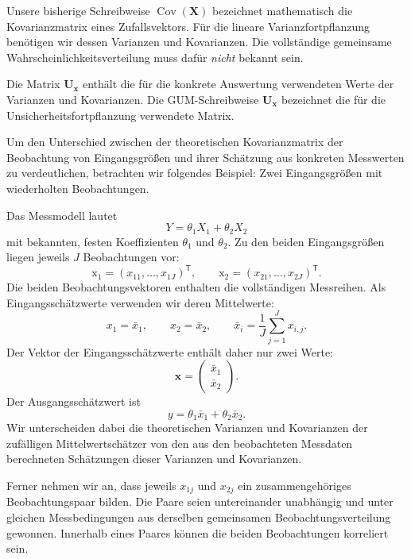 Unsere bisherige Schreibweise $\operatorname{Cov}(\mathbf X)$
bezeichnet mathematisch die Kovarianzmatrix eines Zufallsvektors.
Für die lineare Varianzfortpflanzung benötigen wir dessen
Varianzen und Kovarianzen. Die vollständige gemeinsame
Wahrscheinlichkeitsverteilung muss dafür \emph{nicht} bekannt sein.

Die Matrix $\mathbf U_{\mathbf x}$ enthält die für die konkrete
Auswertung verwendeten Werte der Varianzen und Kovarianzen.
Die GUM-Schreibweise $\mathbf U_{\mathbf x}$ bezeichnet
die für die Unsicherheitsfortpflanzung verwendete Matrix.

Um den Unterschied zwischen der theoretischen Kovarianzmatrix
der Beobachtung von Eingangsgrößen und ihrer Schätzung aus konkreten
Messwerten zu verdeutlichen, betrachten wir folgendes
Beispiel: \glqq Zwei Eingangsgrößen mit wiederholten
Beobachtungen\grqq.

Das Messmodell lautet
\begin{equation}
Y=\theta_1X_1+\theta_2X_2
\label{eq:beispiellinearkombi}
\end{equation}
mit bekannten, festen Koeffizienten $\theta_1$ und $\theta_2$.
Zu den beiden Eingangsgrößen liegen jeweils $J$ Beobachtungen vor:
\begin{equation}
\mathrm x_1=(x_{1 1},\dots,x_{1 J})^\mathsf T,
\qquad
\mathrm x_2=(x_{2 1},\dots,x_{2 J})^\mathsf T.
\end{equation}
Die beiden Beobachtungsvektoren enthalten die vollständigen
Messreihen. Als Eingangsschätzwerte verwenden wir deren Mittelwerte:
\begin{equation}
x_1=\bar x_1,\qquad x_2=\bar x_2,
\qquad
\bar x_i=\frac{1}{J}\sum_{j=1}^{J}x_{i,j}.
\end{equation}
Der Vektor der Eingangsschätzwerte enthält daher nur zwei Werte:
\begin{equation}
\mathbf x=
\begin{pmatrix}
\bar x_1\\
\bar x_2
\end{pmatrix}.
\end{equation}
Der Ausgangsschätzwert ist
\begin{equation}
y=\theta_1\bar x_1+\theta_2\bar x_2.
\end{equation}
Wir unterscheiden dabei die theoretischen
Varianzen und Kovarianzen der zufälligen Mittelwertschätzer
von den aus den beobachteten Messdaten berechneten
Schätzungen dieser Varianzen und Kovarianzen.

Ferner nehmen wir an, dass jeweils $x_{1 j}$ und $x_{2 j}$ ein
zusammengehöriges Beobachtungspaar bilden. Die Paare seien
untereinander unabhängig und unter gleichen Messbedingungen
aus derselben gemeinsamen Beobachtungsverteilung gewonnen.
Innerhalb eines Paares können die beiden Beobachtungen
korreliert sein.

